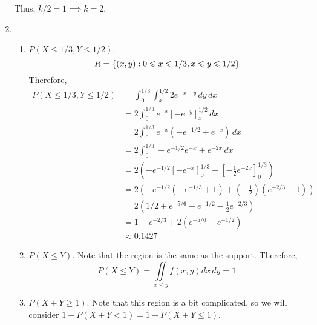 \begin{Example}{}{}
\begin{enumerate}[label=(\roman*)]
              Thus, $ k/2=1\implies k=2 $.
        \item \begin{enumerate}[label=(\alph*)]
                  \item $ P(X\leqslant 1/3,Y\leqslant 1/2) $.
                        \[ R=\{(x,y):0\leqslant x\leqslant 1/3, x\leqslant y\leqslant 1/2\} \]
                        Therefore,
                        \begin{align*}
                            P(X\leqslant 1/3,Y\leqslant 1/2)
                             & =\int_{0}^{1/3} \int_{x}^{1/2} 2e^{-x-y}\, d{y} \, d{x}                                              \\
                             & =2\int_{0}^{1/3} e^{-x}\left[ -e^{-y} \right]_x^{1/2}\, d{x}                                         \\
                             & =2 \int_{0}^{1/3} e^{-x}\left( -e^{-1/2}+e^{-x} \right)\, d{x}                                       \\
                             & =2 \int_{0}^{1/3} -e^{-1/2}e^{-x}+e^{-2x}\, d{x}                                                     \\
                             & =2\left( -e^{-1/2}\left[ -e^{-x} \right]_0^{1/3}+\left[ -\frac{1}{2} e^{-2x} \right]_0^{1/3} \right) \\
                             & =2\left( -e^{-1/2}\left( -e^{-1/3}+1 \right)+\left( -\frac{1}{2}  \right)
                            \left( e^{-2/3}-1 \right) \right)                                                                       \\
                             & =2\left(1/2+e^{-5/6}-e^{-1/2}-\frac{1}{2}e^{-2/3}\right)                                             \\
                             & =1-e^{-2/3}+2\left(e^{-5/6}-e^{-1/2}\right)                                                          \\
                             & \approx 0.1427
                        \end{align*}
                  \item $ P(X\leqslant Y) $. Note that the region
                        is the same as the support. Therefore,
                        \[ P(X\leqslant Y)=\iint\limits_{x\leqslant y}f(x,y)dx\,dy=1 \]
                  \item $ P(X+Y\geqslant 1) $. Note that this region is a
                        bit complicated, so we will consider $ 1-P(X+Y<1)=1-P(X+Y\leqslant 1) $.

\end{enumerate}
\end{enumerate}
\end{Example}
